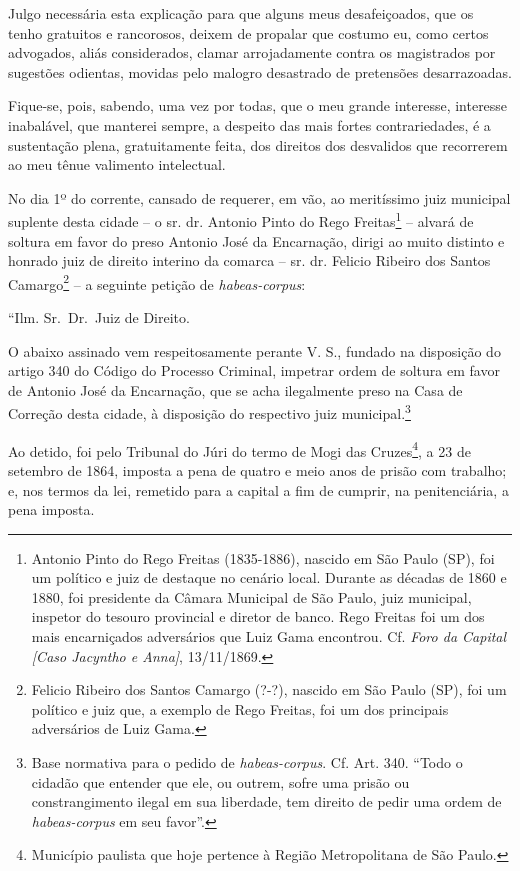 Julgo necessária esta explicação para que alguns meus desafeiçoados, que
os tenho gratuitos e rancorosos, deixem de propalar que costumo eu, como
certos advogados, aliás considerados, clamar arrojadamente contra os
magistrados por sugestões odientas, movidas pelo malogro desastrado de
pretensões desarrazoadas.

Fique-se, pois, sabendo, uma vez por todas, que o meu grande interesse,
interesse inabalável, que manterei sempre, a despeito das mais fortes
contrariedades, é a sustentação plena, gratuitamente feita, dos direitos
dos desvalidos que recorrerem ao meu tênue valimento intelectual.

\asterisc{}

No dia 1º do corrente, cansado de requerer, em vão, ao meritíssimo juiz
municipal suplente desta cidade -- o sr. dr. Antonio Pinto do Rego
Freitas\footnote{Antonio Pinto do Rego Freitas (1835-1886), nascido em
  São Paulo (SP), foi um político e juiz de destaque no cenário local.
  Durante as décadas de 1860 e 1880, foi presidente da Câmara Municipal
  de São Paulo, juiz municipal, inspetor do tesouro provincial e diretor
  de banco. Rego Freitas foi um dos mais encarniçados adversários que
  Luiz Gama encontrou. Cf. \emph{Foro da Capital {[}Caso Jacyntho e
  Anna{]}}, 13/11/1869.} -- alvará de soltura em favor do preso Antonio
José da Encarnação, dirigi ao muito distinto e honrado juiz de direito
interino da comarca -- sr. dr. Felicio Ribeiro dos Santos
Camargo\footnote{Felicio Ribeiro dos Santos Camargo (?-?), nascido em
  São Paulo (SP), foi um político e juiz que, a exemplo de Rego Freitas,
  foi um dos principais adversários de Luiz Gama.} -- a seguinte petição
de \emph{habeas-corpus}:

``Ilm. Sr.~Dr.~Juiz de Direito.

O abaixo assinado vem respeitosamente perante V. S., fundado na
disposição do artigo 340 do Código do Processo Criminal, impetrar ordem
de soltura em favor de Antonio José da Encarnação, que se acha
ilegalmente preso na Casa de Correção desta cidade, à disposição do
respectivo juiz municipal.\footnote{Base normativa para o pedido de
  \emph{habeas-corpus}. Cf. Art. 340. ``Todo o cidadão que entender que
  ele, ou outrem, sofre uma prisão ou constrangimento ilegal em sua
  liberdade, tem direito de pedir uma ordem de \emph{habeas-corpus} em
  seu favor''.}

Ao detido, foi pelo Tribunal do Júri do termo de Mogi das
Cruzes\footnote{Município paulista que hoje pertence à Região
  Metropolitana de São Paulo.}, a 23 de setembro de 1864, imposta a pena
de quatro e meio anos de prisão com trabalho; e, nos termos da lei,
remetido para a capital a fim de cumprir, na penitenciária, a pena
imposta.

